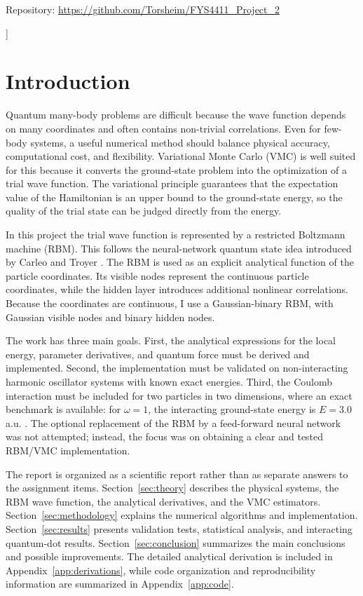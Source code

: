 \documentclass[10pt,a4paper]{article}
\begin{document}
\vspace{0.30cm}
\begin{center}
Repository: \url{https://github.com/Torsheim/FYS4411_Project_2}
\end{center}
\vspace{0.55cm}
]

\section{Introduction}

Quantum many-body problems are difficult because the wave function depends on many coordinates and often contains non-trivial correlations. Even for few-body systems, a useful numerical method should balance physical accuracy, computational cost, and flexibility. Variational Monte Carlo (VMC) is well suited for this because it converts the ground-state problem into the optimization of a trial wave function. The variational principle guarantees that the expectation value of the Hamiltonian is an upper bound to the ground-state energy, so the quality of the trial state can be judged directly from the energy.

In this project the trial wave function is represented by a restricted Boltzmann machine (RBM). This follows the neural-network quantum state idea introduced by Carleo and Troyer \cite{carleo2017}. The RBM is used as an explicit analytical function of the particle coordinates. Its visible nodes represent the continuous particle coordinates, while the hidden layer introduces additional nonlinear correlations. Because the coordinates are continuous, I use a Gaussian-binary RBM, with Gaussian visible nodes and binary hidden nodes.

The work has three main goals. First, the analytical expressions for the local energy, parameter derivatives, and quantum force must be derived and implemented. Second, the implementation must be validated on non-interacting harmonic oscillator systems with known exact energies. Third, the Coulomb interaction must be included for two particles in two dimensions, where an exact benchmark is available: for $\omega=1$, the interacting ground-state energy is $E=3.0$ a.u. \cite{taut1993}. The optional replacement of the RBM by a feed-forward neural network was not attempted; instead, the focus was on obtaining a clear and tested RBM/VMC implementation.

The report is organized as a scientific report rather than as separate answers to the assignment items. Section~\ref{sec:theory} describes the physical systems, the RBM wave function, the analytical derivatives, and the VMC estimators. Section~\ref{sec:methodology} explains the numerical algorithms and implementation. Section~\ref{sec:results} presents validation tests, statistical analysis, and interacting quantum-dot results. Section~\ref{sec:conclusion} summarizes the main conclusions and possible improvements. The detailed analytical derivation is included in Appendix~\ref{app:derivations}, while code organization and reproducibility information are summarized in Appendix~\ref{app:code}.
\end{document}
